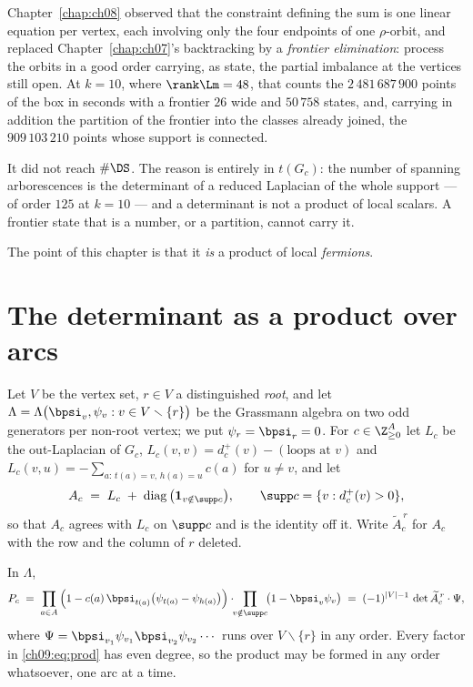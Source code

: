 Chapter~\ref{chap:ch08} observed that the constraint defining the sum is one linear equation per vertex, each
involving only the four endpoints of one $\rho$-orbit, and replaced Chapter~\ref{chap:ch07}'s backtracking by a
\emph{frontier elimination}: process the orbits in a good order carrying, as state, the partial
imbalance at the vertices still open. At $k=10$, where $\rank\Lm=48$, that counts the
$2\,481\,687\,900$ points of the box in seconds with a frontier $26$ wide and $50\,758$ states,
and, carrying in addition the partition of the frontier into the classes already joined, the
$909\,103\,210$ points whose support is connected.

It did not reach $\#\DS$. The reason is entirely in $t(G_c)$: the number of spanning
arborescences is the determinant of a reduced Laplacian of the whole support --- of order $125$
at $k=10$ --- and a determinant is not a product of local scalars. A frontier state that is a
number, or a partition, cannot carry it.

The point of this chapter is that it \emph{is} a product of local \emph{fermions}.

\section{The determinant as a product over arcs}\label{ch09:sec:berezin}

Let $V$ be the vertex set, $r\in V$ a distinguished \emph{root}, and let
$\Lambda=\Lambda\big(\bpsi_v,\psi_v: v\in V\smallsetminus\{r\}\big)$ be the Grassmann algebra on
two odd generators per non-root vertex; we put $\psi_r=\bpsi_r=0$. For $c\in\Z_{\ge0}^A$ let
$L_c$ be the out-Laplacian of $G_c$, $L_c(v,v)=d^+_c(v)-(\text{loops at }v)$ and
$L_c(v,u)=-\sum_{a:\,t(a)=v,\,h(a)=u}c(a)$ for $u\ne v$, and let
\begin{equation}\label{ch09:eq:Aprime}
A_c\;=\;L_c\;+\;\operatorname{diag}\big(\mathbf 1_{v\notin\supp c}\big),
\qquad \supp c=\{v: d^+_c(v)>0\},
\end{equation}
so that $A_c$ agrees with $L_c$ on $\supp c$ and is the identity off it. Write
$\widetilde A_c^{\,r}$ for $A_c$ with the row and the column of $r$ deleted.

\begin{proposition}\label{ch09:prop:arc}
In $\Lambda$,
\begin{equation}\label{ch09:eq:prod}
P_c \;=\;
\prod_{a\in A}\Big(1-c(a)\,\bpsi_{t(a)}\big(\psi_{t(a)}-\psi_{h(a)}\big)\Big)
\cdot\!\!\prod_{v\notin\supp c}\!\!\big(1-\bpsi_v\psi_v\big)
\;=\;(-1)^{|V|-1}\,\det \widetilde A_c^{\,r}\cdot\Psi ,
\end{equation}
where $\Psi=\bpsi_{v_1}\psi_{v_1}\bpsi_{v_2}\psi_{v_2}\cdots$ runs over
$V\smallsetminus\{r\}$ in any order. Every factor in \eqref{ch09:eq:prod} has even degree, so the
product may be formed in any order whatsoever, one arc at a time.
\end{proposition}

